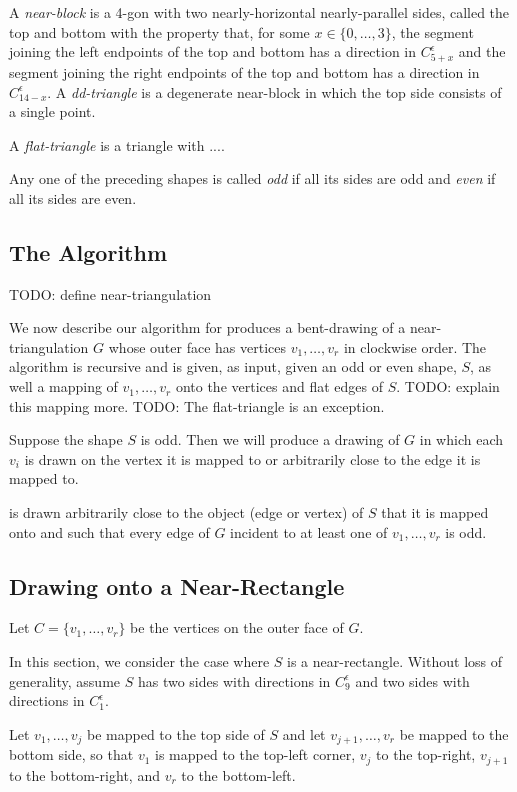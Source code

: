 \documentclass{patmorin}
\begin{document}
A \emph{near-block} is a 4-gon with two nearly-horizontal nearly-parallel
sides, called the top and bottom with the property that, for some
$x\in\{0,\ldots,3\}$, the segment joining the left endpoints of the
top and bottom has a direction in $C_{5+x}^\epsilon$ and the segment
joining the right endpoints of the top and bottom has a direction in
$C_{14-x}^\epsilon$.  A \emph{dd-triangle} is a degenerate near-block
in which the top side consists of a single point.

A \emph{flat-triangle} is a triangle with ....

Any one of the preceding shapes is called \emph{odd} if all its sides
are odd and \emph{even} if all its sides are even.

\subsection{The Algorithm}

TODO: define near-triangulation

We now describe our algorithm for produces a bent-drawing of a
near-triangulation $G$ whose outer face has vertices $v_1,\ldots,v_r$
in clockwise order.  The algorithm is recursive and is given, as input,
given an odd or even shape, $S$, as well a mapping of
$v_1,\ldots,v_r$ onto the vertices and flat edges of $S$.
TODO: explain this mapping more. TODO: The flat-triangle is an exception.

Suppose the shape $S$ is odd.  Then we will produce a drawing of $G$
in which each $v_i$ is drawn on the vertex it is mapped to or arbitrarily close to the edge it is mapped to.


 is drawn arbitrarily close to the object (edge or
vertex) of $S$ that it is mapped onto and such that every edge of $G$
incident to at least one of $v_1,\ldots,v_r$ is odd.


\subsection{Drawing onto a Near-Rectangle}

Let $C=\{v_1,\ldots,v_r\}$ be the vertices on the outer face of $G$.

In this section, we consider the case where $S$ is a near-rectangle.
Without loss of generality, assume $S$ has two sides with directions
in $C_9^{\epsilon}$ and two sides with directions in $C_1^\epsilon$.

Let $v_1,\ldots,v_j$ be mapped to the top side of $S$ and let
$v_{j+1},\ldots,v_r$ be mapped to the bottom side, so that $v_1$
is mapped to the top-left corner, $v_j$ to the top-right, $v_{j+1}$
to the bottom-right, and $v_r$ to the bottom-left.
\end{document}
